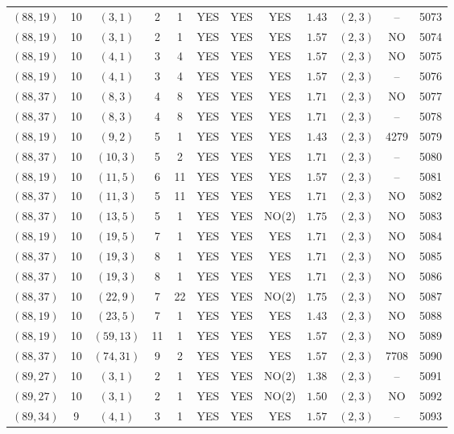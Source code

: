 \begin{longtable}{|c|c|c|c|c|c|c|c|c|c|c|c|}
$(88,19)$ & 10 & $(3,1)$ & 2 & 1 & YES & YES & YES & $1.43$ & $(2,3)$ & -- & 5073\\
$(88,19)$ & 10 & $(3,1)$ & 2 & 1 & YES & YES & YES & $1.57$ & $(2,3)$ & NO & 5074\\
$(88,19)$ & 10 & $(4,1)$ & 3 & 4 & YES & YES & YES & $1.57$ & $(2,3)$ & NO & 5075\\
$(88,19)$ & 10 & $(4,1)$ & 3 & 4 & YES & YES & YES & $1.57$ & $(2,3)$ & -- & 5076\\
$(88,37)$ & 10 & $(8,3)$ & 4 & 8 & YES & YES & YES & $1.71$ & $(2,3)$ & NO & 5077\\
$(88,37)$ & 10 & $(8,3)$ & 4 & 8 & YES & YES & YES & $1.71$ & $(2,3)$ & -- & 5078\\
$(88,19)$ & 10 & $(9,2)$ & 5 & 1 & YES & YES & YES & $1.43$ & $(2,3)$ & 4279 & 5079\\
$(88,37)$ & 10 & $(10,3)$ & 5 & 2 & YES & YES & YES & $1.71$ & $(2,3)$ & -- & 5080\\
$(88,19)$ & 10 & $(11,5)$ & 6 & 11 & YES & YES & YES & $1.57$ & $(2,3)$ & -- & 5081\\
$(88,37)$ & 10 & $(11,3)$ & 5 & 11 & YES & YES & YES & $1.71$ & $(2,3)$ & NO & 5082\\
$(88,37)$ & 10 & $(13,5)$ & 5 & 1 & YES & YES & NO(2) & $1.75$ & $(2,3)$ & NO & 5083\\
$(88,19)$ & 10 & $(19,5)$ & 7 & 1 & YES & YES & YES & $1.71$ & $(2,3)$ & NO & 5084\\
$(88,37)$ & 10 & $(19,3)$ & 8 & 1 & YES & YES & YES & $1.71$ & $(2,3)$ & NO & 5085\\
$(88,37)$ & 10 & $(19,3)$ & 8 & 1 & YES & YES & YES & $1.71$ & $(2,3)$ & NO & 5086\\
$(88,37)$ & 10 & $(22,9)$ & 7 & 22 & YES & YES & NO(2) & $1.75$ & $(2,3)$ & NO & 5087\\
$(88,19)$ & 10 & $(23,5)$ & 7 & 1 & YES & YES & YES & $1.43$ & $(2,3)$ & NO & 5088\\
$(88,19)$ & 10 & $(59,13)$ & 11 & 1 & YES & YES & YES & $1.57$ & $(2,3)$ & NO & 5089\\
$(88,37)$ & 10 & $(74,31)$ & 9 & 2 & YES & YES & YES & $1.57$ & $(2,3)$ & 7708 & 5090\\
$(89,27)$ & 10 & $(3,1)$ & 2 & 1 & YES & YES & NO(2) & $1.38$ & $(2,3)$ & -- & 5091\\
$(89,27)$ & 10 & $(3,1)$ & 2 & 1 & YES & YES & NO(2) & $1.50$ & $(2,3)$ & NO & 5092\\
$(89,34)$ & 9 & $(4,1)$ & 3 & 1 & YES & YES & YES & $1.57$ & $(2,3)$ & -- & 5093\\

\end{longtable}
